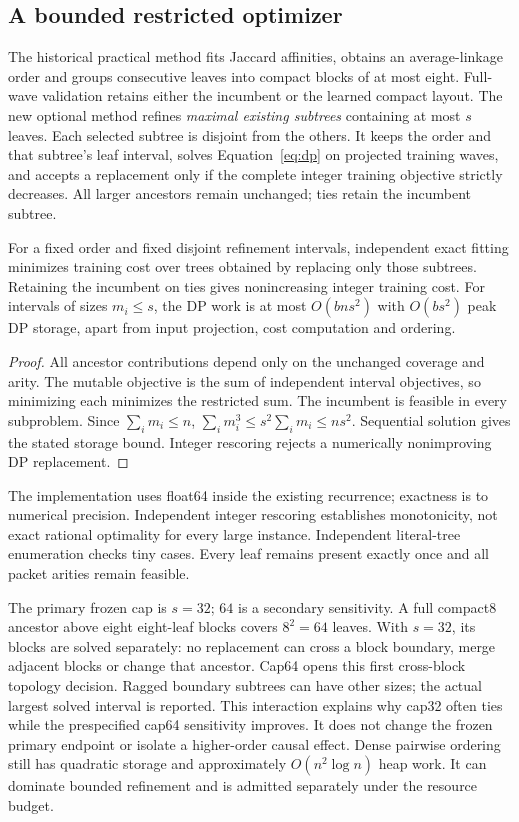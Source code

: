 \subsection{A bounded restricted optimizer}
The historical practical method fits Jaccard affinities, obtains an
average-linkage order and groups consecutive leaves into compact blocks of
at most eight. Full-wave validation retains either the incumbent or the
learned compact layout. The new optional method refines \emph{maximal existing
subtrees} containing at most $s$ leaves. Each selected subtree is disjoint
from the others. It keeps the order and that subtree's leaf interval, solves
Equation~\eqref{eq:dp} on projected training waves, and accepts a replacement
only if the complete integer training objective strictly decreases.
All larger ancestors remain unchanged; ties retain the incumbent subtree.

\begin{proposition}\label{prop:jrefine}
For a fixed order and fixed disjoint refinement intervals, independent exact
fitting minimizes training cost over trees obtained by replacing only those
subtrees. Retaining the incumbent on ties gives nonincreasing integer
training cost. For intervals of sizes $m_i\le s$, the DP work is at most
$O(bns^2)$ with $O(bs^2)$ peak DP storage, apart from input projection,
cost computation and ordering.
\end{proposition}
\begin{proof}
All ancestor contributions depend only on the unchanged coverage and arity.
The mutable objective is the sum of independent interval objectives, so
minimizing each minimizes the restricted sum. The incumbent is feasible in
every subproblem. Since $\sum_im_i\le n$,
$\sum_im_i^3\le s^2\sum_im_i\le ns^2$. Sequential solution gives the stated
storage bound. Integer rescoring rejects a numerically nonimproving DP
replacement.
\end{proof}

The implementation uses float64 inside the existing recurrence; exactness
is to numerical precision. Independent integer rescoring establishes
monotonicity, not exact rational optimality for every large instance.
Independent literal-tree enumeration checks tiny cases. Every leaf remains
present exactly once and all packet arities remain feasible.

The primary frozen cap is $s=32$; $64$ is a secondary sensitivity.
A full compact8 ancestor above eight eight-leaf blocks covers $8^2=64$
leaves. With $s=32$, its blocks are solved separately: no replacement can
cross a block boundary, merge adjacent blocks or change that ancestor.
Cap64 opens this first cross-block topology decision. Ragged boundary
subtrees can have other sizes; the actual largest solved interval is reported.
This interaction explains why cap32 often ties while the prespecified cap64
sensitivity improves. It does not change the frozen primary endpoint or
isolate a higher-order causal effect.
Dense pairwise ordering still has quadratic storage and approximately
$O(n^2\log n)$ heap work. It can dominate bounded refinement and is admitted
separately under the resource budget.
